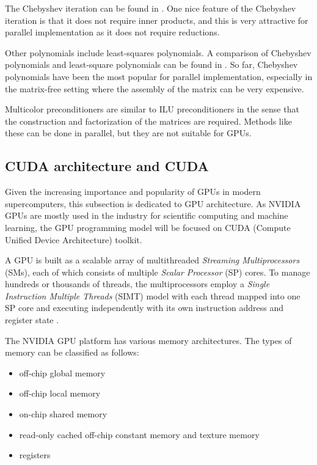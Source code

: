 The Chebyshev iteration can be found in \cite{saad2003iterative}. One nice feature of the Chebyshev iteration is that it does not require inner products, and this is very attractive for parallel implementation as it does not require reductions.

Other polynomials include least-squares polynomials. A comparison of Chebyshev polynomials and least-square polynomials can be found in \cite{ashby1992comparison}. So far, Chebyshev polynomials have been the most popular for parallel implementation, especially in the matrix-free setting where the assembly of the matrix can be very expensive.

Multicolor preconditioners are similar to ILU preconditioners in the sense that the construction and factorization of the matrices are required. Methods like these can be done in parallel, but they are not suitable for GPUs.


\subsection{CUDA architecture and CUDA}
Given the increasing importance and popularity of GPUs in modern supercomputers, this subsection is dedicated to GPU architecture. As NVIDIA GPUs are mostly used in the industry for scientific computing and machine learning, the GPU programming model will be focused on CUDA (Compute Unified Device Architecture) toolkit.

A GPU is built as a scalable array of multithreaded \textit{Streaming Multiprocessors} (SMs), each of which consists of multiple \textit{Scalar Processor} (SP) cores. To manage hundreds or thousands of threads, the multiprocessors employ a \textit{Single Instruction Multiple Threads} (SIMT) model with each thread mapped into one SP core and executing independently with its own instruction address and register state \cite{wilt2013cuda}. 

The NVIDIA GPU platform has various memory architectures. The types of memory can be classified as follows:
\begin{itemize}
    \item off-chip global memory
    \item off-chip local memory
    \item on-chip shared memory
    \item read-only cached off-chip constant memory and texture memory
    \item registers
\end{itemize}

